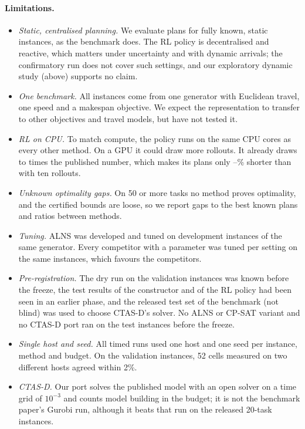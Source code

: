 \paragraph{Limitations.}
\begin{itemize}
\item \emph{Static, centralised planning.} We evaluate plans for fully known, static instances, as the benchmark
  does. The RL policy is decentralised and reactive, which matters under uncertainty and with dynamic arrivals; the
  confirmatory run does not cover such settings, and our exploratory dynamic study (above) supports no claim.
\item \emph{One benchmark.} All instances come from one generator with Euclidean travel, one speed and a makespan
  objective. We expect the representation to transfer to other objectives and travel models, but have not tested it.
\item \emph{RL on CPU.} To match compute, the policy runs on the same CPU cores as every other method. On a GPU it
  could draw more rollouts. It already draws \RLNlo{} to \RLNhi{} times the published number, which makes its plans
  only \RLsamplegainlo--\RLsamplegainhi\% shorter than with ten rollouts.
\item \emph{Unknown optimality gaps.} On 50 or more tasks no method proves optimality, and the certified bounds are
  loose, so we report gaps to the best known plans and ratios between methods.
\item \emph{Tuning.} ALNS was developed and tuned on development instances of the same generator. Every competitor with a
  parameter was tuned per setting on the same instances, which favours the competitors.
\item \emph{Pre-registration.} The dry run on the validation instances was known before the freeze, the test results of the
  constructor and of the RL policy had been seen in an earlier phase, and the released test set of the benchmark
  (not blind) was used to choose CTAS-D's solver. No ALNS or CP-SAT variant and no CTAS-D port ran on the test instances
  before the freeze.
\item \emph{Single host and seed.} All timed runs used one host and one seed per instance, method and budget. On
  the validation instances, 52 cells measured on two different hosts agreed within 2\%.
\item \emph{CTAS-D.} Our port solves the published model with an open solver on a time grid of $10^{-3}$ and counts
  model building in the budget; it is not the benchmark paper's Gurobi run, although it beats that run on the
  released 20-task instances.
\end{itemize}

